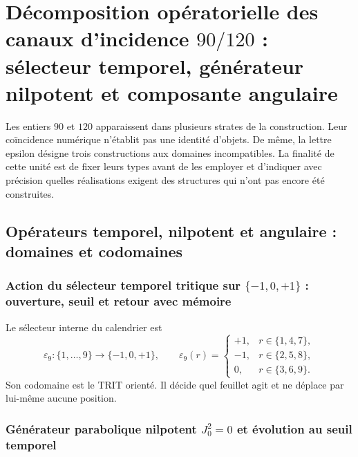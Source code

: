 {%

\section{Décomposition opératorielle des canaux d’incidence \texorpdfstring{\(90/120\)}{90/120} : sélecteur temporel, générateur nilpotent et composante angulaire}
\label{p12-83-c1-s7:chap:canales-90-120-epsilon}

Les entiers \(90\) et \(120\) apparaissent dans plusieurs strates de la construction. Leur
coïncidence numérique n’établit pas une identité d’objets. De même,
la lettre epsilon désigne trois constructions aux domaines incompatibles. La
finalité de cette unité est de fixer leurs types avant de les employer et d’indiquer
avec précision quelles réalisations exigent des structures qui n’ont pas encore été
construites.

\subsection{Opérateurs temporel, nilpotent et angulaire : domaines et codomaines}

\subsubsection{Action du sélecteur temporel tritique sur \(\{-1,0,+1\}\) : ouverture, seuil et retour avec mémoire}

Le sélecteur interne du calendrier est
\begin{equation}
 \varepsilon_9:\{1,\ldots,9\}
 \longrightarrow\{-1,0,+1\},
 \qquad
 \varepsilon_9(r)=
 \begin{cases}
  +1,&r\in\{1,4,7\},\\
  -1,&r\in\{2,5,8\},\\
  0,&r\in\{3,6,9\}.
 \end{cases}
 \label{p12-83-c1-s7:eq:u006e-epsilon-temporal}
\end{equation}
Son codomaine est le TRIT orienté. Il décide quel feuillet agit et ne déplace
par lui-même aucune position.

\subsubsection{Générateur parabolique nilpotent \(J_0^2=0\) et évolution au seuil temporel}

}
